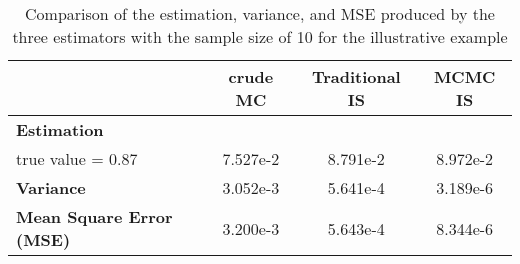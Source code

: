 \begin{table}[H]
    \centering
    \caption{Comparison of the estimation, variance, and MSE produced by the three estimators with the sample size of 10 for the illustrative example}
    \label{table:illustrative_results_10}
    \small
    \begin{tabular}{lccc}
        \hline
        & \textbf{crude MC} & \textbf{Traditional IS} & \textbf{MCMC IS} \\
        \hline
        \textbf{Estimation}\\
        true value = 0.87 & 7.527e-2 & 8.791e-2 & 8.972e-2\\
        \textbf{Variance} & 3.052e-3 & 5.641e-4 & 3.189e-6\\
        \textbf{Mean Square Error (MSE)} & 3.200e-3 & 5.643e-4 & 8.344e-6\\
        \hline
    \end{tabular}
\end{table}